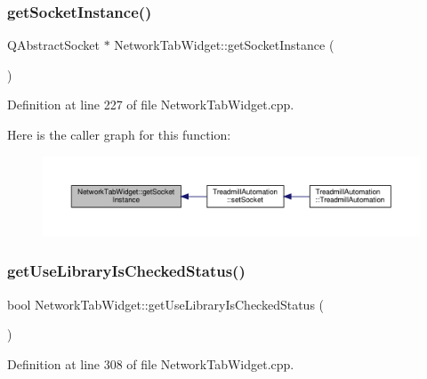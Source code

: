 \subsubsection{\texorpdfstring{get\+Socket\+Instance()}{getSocketInstance()}}
{\footnotesize\ttfamily Q\+Abstract\+Socket $\ast$ Network\+Tab\+Widget\+::get\+Socket\+Instance (\begin{DoxyParamCaption}{ }\end{DoxyParamCaption})}



Definition at line 227 of file Network\+Tab\+Widget.\+cpp.

Here is the caller graph for this function\+:
\nopagebreak
\begin{figure}[H]
\begin{center}
\leavevmode
\includegraphics[width=350pt]{class_network_tab_widget_ae12d4be4ad527d3b9fc0708b9dea6d3d_icgraph}
\end{center}
\end{figure}
\mbox{\label{class_network_tab_widget_a556f499076cd56a2090c007eb5f1e6be}} 
\subsubsection{\texorpdfstring{get\+Use\+Library\+Is\+Checked\+Status()}{getUseLibraryIsCheckedStatus()}}
{\footnotesize\ttfamily bool Network\+Tab\+Widget\+::get\+Use\+Library\+Is\+Checked\+Status (\begin{DoxyParamCaption}{ }\end{DoxyParamCaption})}



Definition at line 308 of file Network\+Tab\+Widget.\+cpp.

